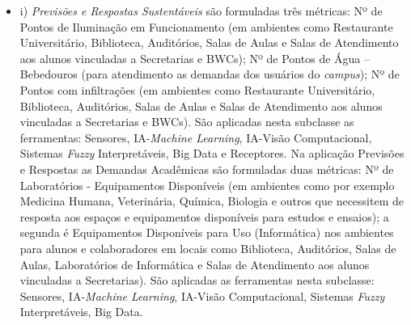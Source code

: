 \documentclass[portuguese]{textolivre}
\begin{document}
\medskip
\begin{itemize}
\item i) \textit{Previsões e Respostas Sustentáveis} são formuladas três métricas: Nº de Pontos de Iluminação em Funcionamento (em ambientes como Restaurante Universitário, Biblioteca, Auditórios, Salas de Aulas e Salas de Atendimento aos alunos vinculadas a Secretarias e BWCs); Nº de Pontos de Água – Bebedouros (para atendimento as demandas dos usuários do \textit{campus}); Nº de Pontos com infiltrações (em ambientes como Restaurante Universitário, Biblioteca, Auditórios, Salas de Aulas e Salas de Atendimento aos alunos vinculadas a Secretarias e BWCs). São aplicadas nesta subclasse as ferramentas: Sensores, IA-\textit{Machine Learning}, IA-Visão Computacional, Sistemas \textit{Fuzzy} Interpretáveis, Big Data e Receptores. Na aplicação Previsões e Respostas as Demandas Acadêmicas são formuladas duas métricas: Nº de Laboratórios - Equipamentos Disponíveis (em ambientes como por exemplo Medicina Humana, Veterinária, Química, Biologia e outros que necessitem de resposta aos espaços e equipamentos disponíveis para estudos e ensaios); a segunda é Equipamentos Disponíveis para Uso (Informática) nos ambientes para alunos e colaboradores em locais como Biblioteca, Auditórios, Salas de Aulas, Laboratórios de Informática e Salas de Atendimento aos alunos vinculadas a Secretarias). São aplicadas as ferramentas nesta subclasse: Sensores, IA-\textit{Machine Learning}, IA-Visão Computacional, Sistemas \textit{Fuzzy} Interpretáveis, Big Data.

\end{itemize}
\end{document}
